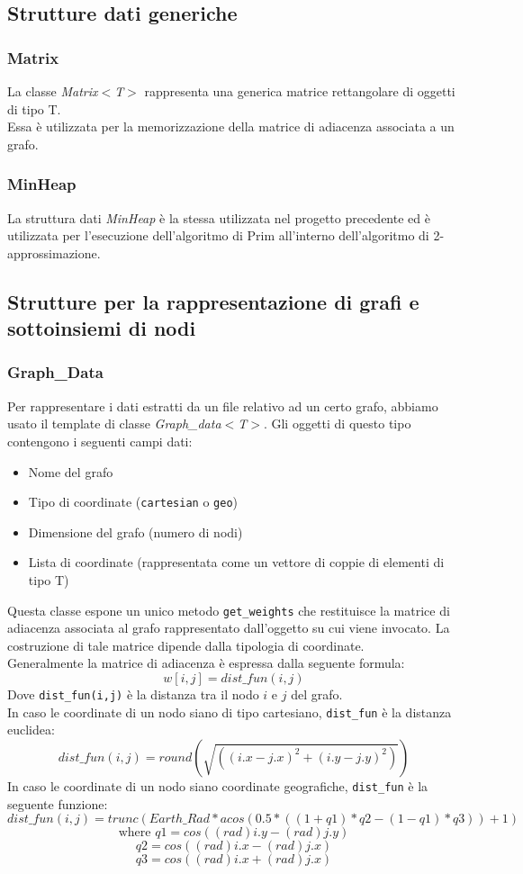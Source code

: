 \documentclass[]{article}
\begin{document}
\subsection{Strutture dati generiche}
\subsubsection{Matrix}
La classe \textit{Matrix$<$T$>$} rappresenta una generica matrice rettangolare di oggetti di tipo T.\\
Essa è utilizzata per la memorizzazione della matrice di adiacenza associata a un grafo.
\subsubsection{MinHeap}
La struttura dati \textit{MinHeap} è la stessa utilizzata nel progetto precedente ed è utilizzata per l'esecuzione dell'algoritmo di Prim all'interno dell'algoritmo di 2-approssimazione.
\subsection{Strutture per la rappresentazione di grafi e sottoinsiemi di nodi}
\subsubsection{Graph\_Data}
Per rappresentare i dati estratti da un file relativo ad un certo grafo, abbiamo usato il template di classe \textit{Graph\_data$<$T$>$}. Gli oggetti di questo tipo contengono i seguenti campi dati:
\begin{itemize}
	\item Nome del grafo
	\item Tipo di coordinate (\verb|cartesian| o \verb|geo|)
	\item Dimensione del grafo (numero di nodi)
	\item Lista di coordinate (rappresentata come un vettore di coppie di elementi di tipo T)
\end{itemize}
Questa classe espone un unico metodo \verb|get_weights| che restituisce la matrice di adiacenza associata al grafo rappresentato dall'oggetto su cui viene invocato. La costruzione di tale matrice dipende dalla tipologia di coordinate.\\
Generalmente la matrice di adiacenza è espressa dalla seguente formula:
$$w[i,j]=dist\_fun(i, j)$$
Dove \verb|dist_fun(i,j)| è la distanza tra il nodo $i$ e $j$ del grafo.\\
In caso le coordinate di un nodo siano di tipo cartesiano, \verb|dist_fun| è la distanza euclidea:
$$dist\_fun(i,j)=round(\sqrt{((i.x - j.x)^2 + (i.y - j.y)^2)})$$
In caso le coordinate di un nodo siano coordinate geografiche, \verb|dist_fun| è la seguente funzione:
$$dist\_fun(i,j) = trunc(Earth\_Rad * acos(0.5*((1+q1)*q2-(1-q1)*q3))+1)$$
$$\text{where } q1 = cos((rad)i.y - (rad)j.y)$$
$$q2 = cos((rad)i.x - (rad)j.x)$$
$$q3 = cos((rad)i.x + (rad)j.x)$$
\end{document}

